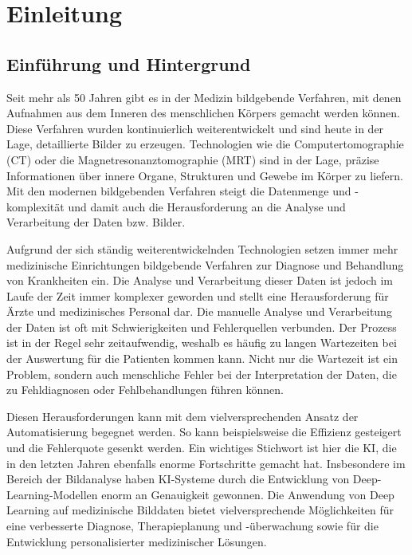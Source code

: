 
\chapter{Einleitung}
\section{Einführung und Hintergrund}
Seit mehr als 50 Jahren gibt es in der Medizin bildgebende Verfahren, mit denen Aufnahmen aus dem Inneren des menschlichen Körpers gemacht werden können. Diese Verfahren wurden kontinuierlich weiterentwickelt und sind heute in der Lage, detaillierte Bilder zu erzeugen. Technologien wie die Computertomographie (CT) oder die Magnetresonanztomographie (\ac{MRT}) sind in der Lage, präzise Informationen über innere Organe, Strukturen und Gewebe im Körper zu liefern. \cite[vgl.][]{Heinrichs2022} Mit den modernen bildgebenden Verfahren steigt die Datenmenge und -komplexität und damit auch die Herausforderung an die Analyse und Verarbeitung der Daten bzw. Bilder.

Aufgrund der sich ständig weiterentwickelnden Technologien setzen immer mehr medizinische Einrichtungen bildgebende Verfahren zur Diagnose und Behandlung von Krankheiten ein. Die Analyse und Verarbeitung dieser Daten ist jedoch im Laufe der Zeit immer komplexer geworden und stellt eine Herausforderung für Ärzte und medizinisches Personal dar. Die manuelle Analyse und Verarbeitung der Daten ist oft mit Schwierigkeiten und Fehlerquellen verbunden. Der Prozess ist in der Regel sehr zeitaufwendig, weshalb es häufig zu langen Wartezeiten bei der Auswertung für die Patienten kommen kann. Nicht nur die Wartezeit ist ein Problem, sondern auch menschliche Fehler bei der Interpretation der Daten, die zu Fehldiagnosen oder Fehlbehandlungen führen können. \cite[vgl.][]{Ramsundar2020}

Diesen Herausforderungen kann mit dem vielversprechenden Ansatz der Automatisierung begegnet werden. So kann beispielsweise die Effizienz gesteigert und die Fehlerquote gesenkt werden. Ein wichtiges Stichwort ist hier die \ac{KI}, die in den letzten Jahren ebenfalls enorme Fortschritte gemacht hat. Insbesondere im Bereich der Bildanalyse haben \ac{KI}-Systeme durch die Entwicklung von Deep-Learning-\gls{Modell}en enorm an Genauigkeit gewonnen. Die Anwendung von Deep Learning auf medizinische Bilddaten bietet vielversprechende Möglichkeiten für eine verbesserte Diagnose, Therapieplanung und -überwachung sowie für die Entwicklung personalisierter medizinischer Lösungen.

